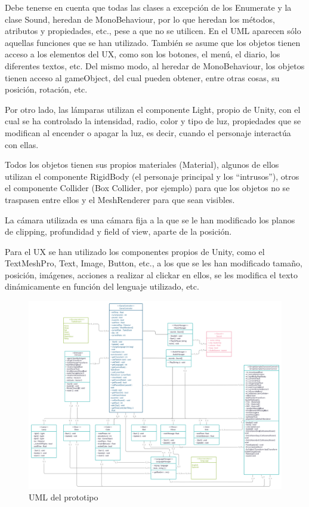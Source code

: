 \documentclass[12pt, a4paper,twoside,titlepage]{book}
\begin{document}
 Debe tenerse en cuenta que todas las clases a excepción de los Enumerate y la clase Sound, heredan de MonoBehaviour, por lo que heredan los métodos, atributos y propiedades, etc., pese a que no se utilicen. En el UML aparecen sólo aquellas funciones que se han utilizado. También se asume que los objetos tienen acceso a los elementos del UX, como son los botones, el menú, el diario, los diferentes textos, etc. Del mismo modo, al heredar de MonoBehaviour, los objetos tienen acceso al gameObject, del cual pueden obtener, entre otras cosas, su posición, rotación, etc. 

Por otro lado, las lámparas utilizan el componente Light, propio de Unity, con el cual se ha controlado la intensidad, radio, color y tipo de luz, propiedades que se modifican al encender o apagar la luz, es decir, cuando el personaje interactúa con ellas. 

Todos los objetos tienen sus propios materiales (Material), algunos de ellos utilizan el componente RigidBody (el personaje principal y los ``intrusos''), otros el componente Collider (Box Collider, por ejemplo) para que los objetos no se traspasen entre ellos y el MeshRenderer para que sean visibles.

La cámara utilizada es una cámara fija a la que se le han modificado los planos de clipping, profundidad y field of view, aparte de la posición. 

Para el UX se han utilizado los componentes propios de Unity, como el TextMeshPro, Text, Image, Button, etc., a los que se les han modificado tamaño, posición, imágenes, acciones a realizar al clickar en ellos, se les modifica el texto dinámicamente en función del lenguaje utilizado, etc. 

\begin{landscape}
\begin{figure}
    \centering
    \includegraphics[width=1\linewidth]{TGF/Extra/UML.png}
    \caption{UML del prototipo}
    \label{fig:UML}
\end{figure}
\end{landscape}
\end{document}
